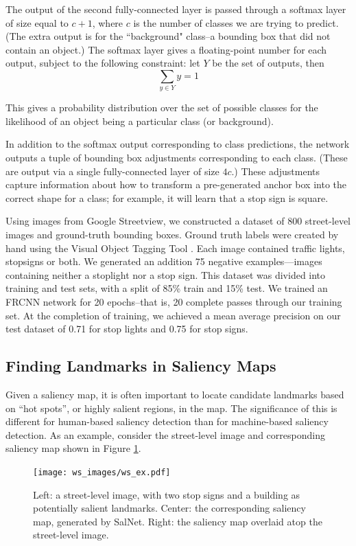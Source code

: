 The output of the second fully-connected layer is passed through a softmax layer of size equal to $c + 1$, where $c$ is the number of classes we are trying to predict. (The extra output is for the ``background" class--a bounding box that did not contain an object.)  The softmax layer gives a floating-point number for each output, subject to the following constraint: let $Y$ be the set of outputs, then 
\begin{equation}
    \sum\limits_{y \in Y} y = 1
\end{equation}

This gives a probability distribution over the set of possible classes for the likelihood of an object being a particular class (or background).

In addition to the softmax output corresponding to class predictions, the network outputs a tuple of bounding box adjustments corresponding to each class. (These are output via a single fully-connected layer of size $4c$.) These adjustments capture information about how to transform a pre-generated anchor box into the correct shape for a class; for example, it will learn that a stop sign is square.

Using images from Google Streetview, we constructed a dataset of 800 street-level images and ground-truth bounding boxes. Ground truth labels were created by hand using the Visual Object Tagging Tool \cite{vott}. Each image contained traffic lights, stopsigns or both. We generated an addition 75 negative examples---images containing neither a stoplight nor a stop sign. This dataset was divided into training and test sets, with a split of 85\% train and 15\% test. We trained an FRCNN network for 20 epochs--that is, 20 complete passes through our training set. At the completion of training, we achieved a mean average precision on our test dataset of 0.71 for stop lights and 0.75 for stop signs.

\subsection{Finding Landmarks in Saliency Maps}\label{Sect:watershed}
Given a saliency map, it is often important to locate candidate landmarks based on “hot spots”, or highly salient regions, in the map. The significance of this is different for human-based saliency detection than for machine-based saliency detection. As an example, consider the street-level image and corresponding saliency map shown in Figure \ref{fig:ws:ex}.

\begin{figure}[htbp]
  \centering
  \texttt{[image: ws\_images/ws\_ex.pdf]}
  \caption{Left: a street-level image, with two stop signs and a building as potentially salient landmarks. Center: the corresponding saliency map, generated by SalNet. Right: the saliency map overlaid atop the street-level image.}
  \label{fig:ws:ex}
\end{figure}

